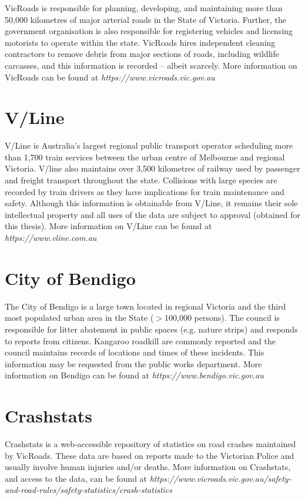 VicRoads is responsible for planning, developing, and maintaining more than 50,000 kilometres of major arterial roads in the State of Victoria. Further, the government organisation is also responsible for registering vehicles and licensing motorists to operate within the state. VicRoads hires independent cleaning contractors to remove debris from major sections of roads, including wildlife carcasses, and this information is recorded -- albeit scarcely. More information on VicRoads can be found at \textit{https://www.vicroads.vic.gov.au}

\section{V/Line}

V/Line is Australia's largest regional public transport operator scheduling more than 1,700 train services between the urban centre of Melbourne and regional Victoria. V/line also maintains over 3,500 kilometres of railway used by passenger and freight transport throughout the state. Collisions with large species are recorded by train drivers as they have implications for train maintenance and safety. Although this information is obtainable from V/Line, it remains their sole intellectual property and all uses of the data are subject to approval (obtained for this thesis). More information on V/Line can be found at \textit{https://www.vline.com.au}

\section{City of Bendigo}

The City of Bendigo is a large town located in regional Victoria and the third most populated urban area in the State ($>$100,000 persons). The council is responsible for litter abatement in public spaces (e.g. nature strips) and responds to reports from citizens. Kangaroo roadkill are commonly reported and the council maintains records of locations and times of these incidents. This information may be requested from the public works department. More information on Bendigo can be found at \textit{https://www.bendigo.vic.gov.au}

\section{Crashstats}

Crashstats is a web-accessible repository of statistics on road crashes maintained by VicRoads. These data are based on reports made to the Victorian Police and usually involve human injuries and/or deaths. More information on Crashstats, and access to the data, can be found at \textit{https://www.vicroads.vic.gov.au/safety-and-road-rules/safety-statistics/crash-statistics}

